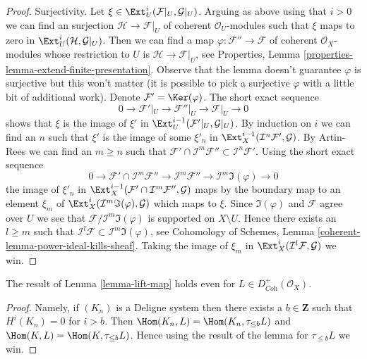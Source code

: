 \begin{proof}
\medskip\noindent
Surjectivity. Let $\xi \in \Ext^i_U(\mathcal{F}|_U, \mathcal{G}|_U)$.
Arguing as above using that $i > 0$ we can find an surjection
$\mathcal{H} \to \mathcal{F}|_U$ of coherent $\mathcal{O}_U$-modules
such that $\xi$ maps to zero in $\Ext^i_U(\mathcal{H}, \mathcal{G}|_U)$.
Then we can find a map $\varphi : \mathcal{F}'' \to \mathcal{F}$
of coherent $\mathcal{O}_X$-modules whose restriction to $U$ is
$\mathcal{H} \to \mathcal{F}|_U$, see
Properties, Lemma \ref{properties-lemma-extend-finite-presentation}.
Observe that the lemma doesn't guarantee $\varphi$ is surjective
but this won't matter (it is possible to pick a surjective $\varphi$
with a little bit of additional work).
Denote $\mathcal{F}' = \Ker(\varphi)$. The short exact sequence
$$
0 \to \mathcal{F}'|_U \to \mathcal{F}''|_U \to \mathcal{F}|_U \to 0
$$
shows that $\xi$ is the image of $\xi'$ in
$\Ext^{i - 1}_U(\mathcal{F}'|_U, \mathcal{G}|_U)$.
By induction on $i$ we can find an $n$ such that
$\xi'$ is the image of some $\xi'_n$ in
$\Ext^{i - 1}_X(\mathcal{I}^n\mathcal{F}', \mathcal{G})$.
By Artin-Rees we can find an $m \geq n$ such that
$\mathcal{F}' \cap \mathcal{I}^m\mathcal{F}'' \subset
\mathcal{I}^n\mathcal{F}'$. Using the short exact sequence
$$
0 \to \mathcal{F}' \cap \mathcal{I}^m\mathcal{F}'' \to
\mathcal{I}^m\mathcal{F}'' \to \mathcal{I}^m\Im(\varphi) \to 0
$$
the image of $\xi'_n$ in
$\Ext^{i - 1}_X(\mathcal{F}' \cap \mathcal{I}^m\mathcal{F}'', \mathcal{G})$
maps by the boundary map to an element $\xi_m$ of
$\Ext^i_X(\mathcal{I}^m\Im(\varphi), \mathcal{G})$ which maps
to $\xi$. Since $\Im(\varphi)$ and $\mathcal{F}$ agree over $U$
we see that $\mathcal{F}/\mathcal{I}^m\Im(\varphi)$ is supported
on $X \setminus U$. Hence there exists an $l \geq m$
such that $\mathcal{I}^l\mathcal{F} \subset \mathcal{I}^m\Im(\varphi)$, see
Cohomology of Schemes, Lemma \ref{coherent-lemma-power-ideal-kills-sheaf}.
Taking the image of $\xi_m$ in
$\Ext^i_X(\mathcal{I}^l\mathcal{F}, \mathcal{G})$ we win.
\end{proof}

\begin{lemma}
\label{lemma-lift-map-plus}
The result of Lemma \ref{lemma-lift-map} holds even for
$L \in D^+_{\textit{Coh}}(\mathcal{O}_X)$.
\end{lemma}

\begin{proof}
Namely, if $(K_n)$ is a Deligne system then there exists a
$b \in \mathbf{Z}$ such that $H^i(K_n) = 0$ for $i > b$.
Then $\Hom(K_n, L) = \Hom(K_n, \tau_{\leq b}L)$ and
$\Hom(K, L) = \Hom(K, \tau_{\leq b}L)$. Hence using
the result of the lemma for $\tau_{\leq b}L$ we win.
\end{proof}


